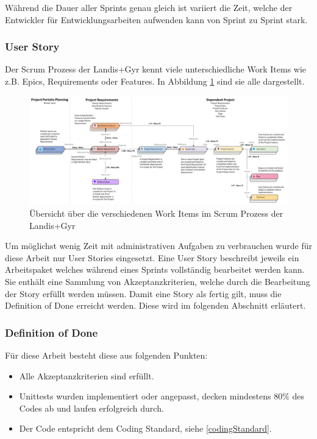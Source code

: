 Während die Dauer aller Sprints genau gleich ist variiert die Zeit, welche der Entwickler für Entwicklungsarbeiten aufwenden kann von Sprint zu Sprint stark.

\subsubsection{User Story}\label{userstory}
Der Scrum Prozess der Landis+Gyr kennt viele unterschiedliche Work Items wie z.B. Epics, Requirements oder Features.
In Abbildung \ref{fig:workitems} sind sie alle dargestellt.
\begin{figure}[H]
   \centering
   \includegraphics[width=1.0\textwidth]{gfx/WorkItemRelationsship.png}
   \caption{
      Übersicht über die verschiedenen Work Items im Scrum Prozess der Landis+Gyr
      }
      \label{fig:workitems}
\end{figure}
Um möglichst wenig Zeit mit administrativen Aufgaben zu verbrauchen wurde für diese Arbeit nur User Stories eingesetzt.
Eine User Story beschreibt jeweils ein Arbeitspaket welches während eines Sprints vollständig bearbeitet werden kann.
Sie enthält eine Sammlung von Akzeptanzkriterien, welche durch die Bearbeitung der Story erfüllt werden müssen.
Damit eine Story als fertig gilt, muss die Definition of Done erreicht werden. Diese wird im folgenden Abschnitt erläutert.


\subsubsection{Definition of Done}
Für diese Arbeit besteht diese aus folgenden Punkten:
\begin{itemize}
   \item Alle Akzeptanzkriterien sind erfüllt.
   \item Unittests wurden implementiert oder angepasst, decken mindestens 80\% des Codes ab und laufen erfolgreich durch.
   \item Der Code entspricht dem Coding Standard, siehe \ref{codingStandard}.
\end{itemize}

